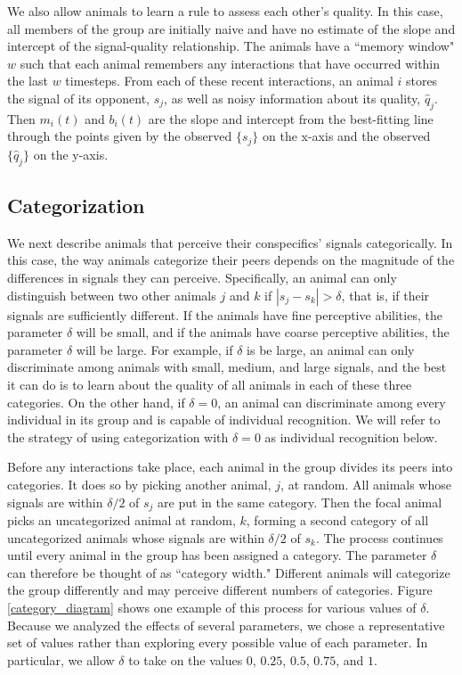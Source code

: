 We also allow animals to learn a rule to assess each other's quality. In this case, all members of the group are initially naive and have no estimate of the slope and intercept of the signal-quality relationship. The animals have a ``memory window" $w$ such that each animal remembers any interactions that have occurred within the last $w$ timesteps. From each of these recent interactions, an animal $i$ stores the signal of its opponent, $s_j$, as well as noisy information about its quality, $\hat{q}_j$.  Then $m_i(t)$ and $b_i(t)$ are the slope and intercept from the best-fitting line through the points given by the observed $\{s_j\}$ on the x-axis and the observed $\{\hat{q}_j\}$ on the y-axis.   

\subsection*{Categorization}
We next describe animals that perceive their conspecifics' signals categorically. In this case, the way animals categorize their peers depends on the magnitude of the differences in signals they can perceive. Specifically, an animal can only distinguish between two other animals $j$ and $k$ if $|s_j-s_k|>\delta$, that is, if their signals are sufficiently different. If the animals have fine perceptive abilities, the parameter $\delta$ will be small, and if the animals have coarse perceptive abilities, the parameter $\delta$ will be large. For example, if $\delta$ is be large, an animal can only discriminate among animals with small, medium, and large signals, and the best it can do is to learn about the quality of all animals in each of these three categories. On the other hand, if $\delta=0$, an animal can discriminate among every individual in its group and is capable of individual recognition. We will refer to the strategy of using categorization with $\delta=0$ as individual recognition below.

Before any interactions take place, each animal in the group divides its peers into categories. It does so by picking another animal, $j$, at random. All animals whose signals are within $\delta/2$ of $s_j$ are put in the same category. Then the focal animal picks an uncategorized animal at random, $k$, forming a second category of all uncategorized animals whose signals are within $\delta/2$ of $s_k$. The process continues until every animal in the group has been assigned a category. The parameter $\delta$ can therefore be thought of as ``category width."  Different animals will categorize the group differently and may perceive different numbers of categories. Figure \ref{category_diagram} shows one example of this process for various values of $\delta$. Because we analyzed the effects of several parameters, we chose a representative set of values rather than exploring every possible value of each parameter. In particular, we allow $\delta$ to take on the values $0$, $0.25$, $0.5$, $0.75$, and $1$.


